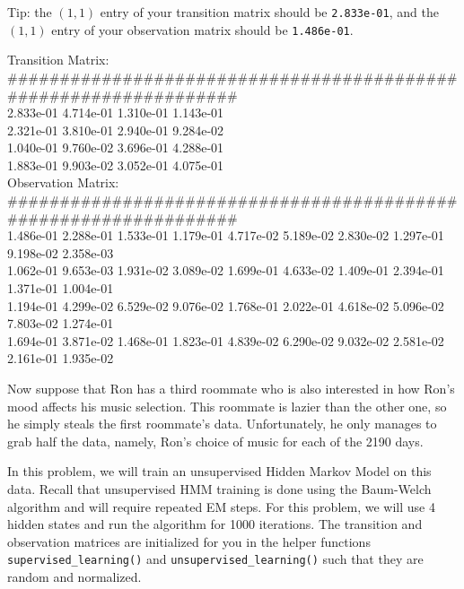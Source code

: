 Tip: the \((1,1)\) entry of your transition matrix should be \verb|2.833e-01|, and the \((1,1)\) entry of your observation matrix should be \verb|1.486e-01|.
\begin{solution}
  Transition Matrix:\\
{\footnotesize \#\#\#\#\#\#\#\#\#\#\#\#\#\#\#\#\#\#\#\#\#\#\#\#\#\#\#\#\#\#\#\#\#\#\#\#\#\#\#\#\#\#\#\#\#\#\#\#\#\#\#\#\#\#\#\#\#\#\#\#\#\#\#\#\#\\}
2.833e-01   4.714e-01   1.310e-01   1.143e-01   \\
2.321e-01   3.810e-01   2.940e-01   9.284e-02   \\
1.040e-01   9.760e-02   3.696e-01   4.288e-01   \\
1.883e-01   9.903e-02   3.052e-01   4.075e-01   \\


Observation Matrix:  \\
{\footnotesize \#\#\#\#\#\#\#\#\#\#\#\#\#\#\#\#\#\#\#\#\#\#\#\#\#\#\#\#\#\#\#\#\#\#\#\#\#\#\#\#\#\#\#\#\#\#\#\#\#\#\#\#\#\#\#\#\#\#\#\#\#\#\#\#\#\\}
1.486e-01   2.288e-01   1.533e-01   1.179e-01   4.717e-02   5.189e-02   2.830e-02   1.297e-01   9.198e-02   2.358e-03   \\
1.062e-01   9.653e-03   1.931e-02   3.089e-02   1.699e-01   4.633e-02   1.409e-01   2.394e-01   1.371e-01   1.004e-01   \\
1.194e-01   4.299e-02   6.529e-02   9.076e-02   1.768e-01   2.022e-01   4.618e-02   5.096e-02   7.803e-02   1.274e-01   \\
1.694e-01   3.871e-02   1.468e-01   1.823e-01   4.839e-02   6.290e-02   9.032e-02   2.581e-02   2.161e-01   1.935e-02 \\
\end{solution}
\indent\problem[15] %
Now suppose that Ron has a third roommate who is also interested in how Ron's mood affects his music selection. This roommate is lazier than the other one, so he simply steals the first roommate's data. Unfortunately, he only manages to grab half the data, namely, Ron's choice of music for each of the 2190 days.

In this problem, we will train an unsupervised Hidden Markov Model on this data. Recall that unsupervised HMM training is done using the Baum-Welch algorithm and will require repeated EM steps. For this problem, we will use 4 hidden states and run the algorithm for 1000 iterations. The transition and observation matrices are initialized for you in the helper functions \texttt{supervised\_learning()} and \texttt{unsupervised\_learning()} such that they are random and normalized.

